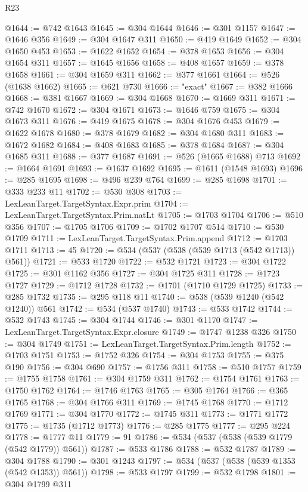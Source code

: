 \begin{lexlean}{R23}
\begin{coremodule}
@1644 := @742 @1643
@1645 := @304 @1644
@1646 := @301 @1157
@1647 := @1646 @356
@1649 := @304 @1647 @311
@1650 := @419 @1649
@1652 := @304 @1650 @453
@1653 := @1622 @1652
@1654 := @378 @1653
@1656 := @304 @1654 @311
@1657 := @1645 @1656
@1658 := @408 @1657
@1659 := @378 @1658
@1661 := @304 @1659 @311
@1662 := @377 @1661
@1664 := @526 (@1638 @1662)
@1665 := @621 @730
@1666 := "exact"
@1667 := @382 @1666
@1668 := @381 @1667
@1669 := @304 @1668
@1670 := @1669 @311
@1671 := @742 @1670
@1672 := @304 @1671
@1673 := @1646 @759
@1675 := @304 @1673 @311
@1676 := @419 @1675
@1678 := @304 @1676 @453
@1679 := @1622 @1678
@1680 := @378 @1679
@1682 := @304 @1680 @311
@1683 := @1672 @1682
@1684 := @408 @1683
@1685 := @378 @1684
@1687 := @304 @1685 @311
@1688 := @377 @1687
@1691 := @526 (@1665 @1688) @713
@1692 := @1664 @1691
@1693 := @1637 @1692
@1695 := @1611 (@1548 @1693)
@1696 := @285 @1695
@1698 := @496 @239 @764
@1699 := @285 @1698
@1701 := @333 @233 @11
@1702 := @530 @308
@1703 := LexLeanTarget.TargetSyntax.Expr.prim
@1704 := LexLeanTarget.TargetSyntax.Prim.natLt
@1705 := @1703 @1704
@1706 := @510 @356
@1707 := @1705 @1706
@1709 := @1702 @1707 @514
@1710 := @530 @1709
@1711 := LexLeanTarget.TargetSyntax.Prim.append
@1712 := @1703 @1711
@1713 := 45
@1720 := @534 (@537 (@538 (@539 @1713 (@542 @1713)) @561))
@1721 := @533 @1720
@1722 := @532 @1721
@1723 := @304 @1722
@1725 := @301 @1162 @356
@1727 := @304 @1725 @311
@1728 := @1723 @1727
@1729 := @1712 @1728
@1732 := @1701 (@1710 @1729 @1725)
@1733 := @285 @1732
@1735 := @295 @118 @11
@1740 := @538 (@539 @1240 (@542 @1240)) @561
@1742 := @534 (@537 @1740)
@1743 := @533 @1742
@1744 := @532 @1743
@1745 := @304 @1744
@1746 := @301 @1170
@1747 := LexLeanTarget.TargetSyntax.Expr.closure
@1749 := @1747 @1238 @326
@1750 := @304 @1749
@1751 := LexLeanTarget.TargetSyntax.Prim.length
@1752 := @1703 @1751
@1753 := @1752 @326
@1754 := @304 @1753
@1755 := @375 @190
@1756 := @304 @690
@1757 := @1756 @311
@1758 := @510 @1757
@1759 := @1755 @1758
@1761 := @304 @1759 @311
@1762 := @1754 @1761
@1763 := @1750 @1762
@1764 := @1746 @1763
@1765 := @305 @1764
@1766 := @365 @1765
@1768 := @304 @1766 @311
@1769 := @1745 @1768
@1770 := @1712 @1769
@1771 := @304 @1770
@1772 := @1745 @311
@1773 := @1771 @1772
@1775 := @1735 (@1712 @1773)
@1776 := @285 @1775
@1777 := @295 @224
@1778 := @1777 @11
@1779 := 91
@1786 := @534 (@537 (@538 (@539 @1779 (@542 @1779)) @561))
@1787 := @533 @1786
@1788 := @532 @1787
@1789 := @304 @1788
@1790 := @301 @1243
@1797 := @534 (@537 (@538 (@539 @1353 (@542 @1353)) @561))
@1798 := @533 @1797
@1799 := @532 @1798
@1801 := @304 @1799 @311

\end{coremodule}
\end{lexlean}
